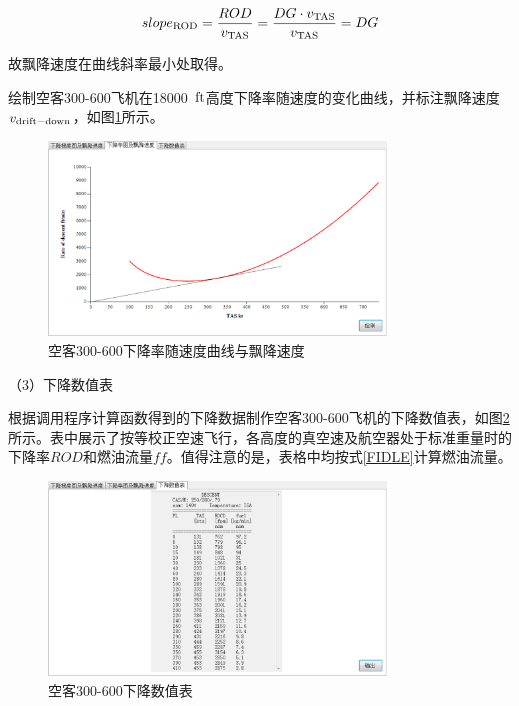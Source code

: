 \documentclass[a4paper,punct,space,heading=true,AutoFakeBold]{ctexrep}
\begin{document}
\begin{equation}
slope_{\rm ROD}=\frac{ROD}{v_{\rm TAS}}=\frac{DG\cdot v_{\rm TAS}}{v_{\rm TAS}}=DG
\end{equation}

故飘降速度在曲线斜率最小处取得。

绘制空客300-600飞机在18000\ $\rm ft$高度下降率随速度的变化曲线，并标注飘降速度$v_{\rm drift-down}$，如图\ref{rod}所示。

\begin{figure}[h]
	\centering
	\includegraphics[width=0.8\textwidth]{pic/rod.eps}\hspace{30pt}
	\caption{空客300-600下降率随速度曲线与飘降速度}\label{rod}
\end{figure}


（3）下降数值表

根据调用程序计算函数得到的下降数据制作空客300-600飞机的下降数值表，如图\ref{descenttable}所示。表中展示了按等校正空速飞行，各高度的真空速及航空器处于标准重量时的下降率$ROD$和燃油流量$ff$。值得注意的是，表格中均按式\ref{FIDLE}计算燃油流量。

\begin{figure}[h]
	\centering
	\includegraphics[width=0.8\textwidth]{pic/descenttable.eps}\hspace{30pt}
	\caption{空客300-600下降数值表}\label{descenttable}
\end{figure}
\end{document}
